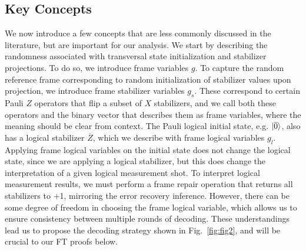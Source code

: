 \subsection{Key Concepts}
\label{methods:nonstandard_concepts}
We now introduce a few concepts that are less commonly discussed in the literature, but are important for our analysis.
%
We start by describing the randomness associated with transversal state initialization and stabilizer projections.
%
To do so, we introduce frame variables $g$.
%
To capture the random reference frame corresponding to random initialization of stabilizer values upon projection, we introduce frame stabilizer variables $g_s$.
%
These correspond to certain Pauli $Z$ operators that flip a subset of $X$ stabilizers, and we call both these operators and the binary vector that describes them as frame variables, where the meaning should be clear from context.
%
The Pauli logical initial state, e.g. $|{\overline{0}}\rangle$, also has a logical stabilizer $\overline{Z}$, which we describe with frame logical variables $g_l$.
%
Applying frame logical variables on the initial state does not change the logical state, since we are applying a logical stabilizer, but this does change the interpretation of a given logical measurement shot.
%
To interpret logical measurement results, we must perform a frame repair operation that returns all stabilizers to +1, mirroring the error recovery inference.
%
However, there can be some degree of freedom in choosing the frame logical variable, which allows us to ensure consistency between multiple rounds of decoding.
%
These understandings lead us to propose the decoding strategy shown in Fig.~\ref{fig:fig2}, and will be crucial to our FT proofs below.

